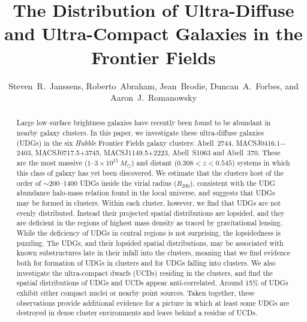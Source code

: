 \documentclass[iop,tighten,twocolumn,apj,floatfix]{emulateapj}
\begin{document}
\title{The Distribution of Ultra-Diffuse and Ultra-Compact Galaxies in the Frontier Fields}

\author{Steven~R.~Janssens, Roberto~Abraham,
Jean~Brodie, Duncan~A.~Forbes, and
Aaron~J.~Romanowsky}




\begin{abstract}
Large low surface brightness galaxies have recently been found to be abundant
in nearby galaxy clusters. In this paper, we investigate these
ultra-diffuse galaxies (UDGs) in the six \textit{Hubble} Frontier Fields
galaxy clusters: Abell~2744, MACSJ0416.1$-$2403,
MACSJ0717.5$+$3745, MACSJ1149.5$+$2223, Abell~S1063 and Abell~370.  These
are the most massive ($1$--$3 \times 10^{15}~M_\odot$) and distant ($0.308
< z < 0.545$) systems in which this class of galaxy has yet been
discovered. We estimate that the clusters host of the order of ${\sim}$200--1400 UDGs
inside the virial radius ($R_{200}$), consistent with the UDG abundance
halo-mass relation found in the local universe, and suggests that UDGs may
be formed in clusters. Within each cluster, however, we find that UDGs are
not evenly distributed. Instead their projected spatial distributions are
lopsided, and they are deficient in the regions of highest mass density as
traced by gravitational lensing. While the deficiency of UDGs in central
regions is not surprising, the lopsidedness is puzzling. The UDGs, and their
lopsided spatial distributions, may be
associated with known substructures late in their infall into the
clusters, meaning that we find evidence both for formation of UDGs in clusters
and for UDGs falling into clusters. We also investigate the ultra-compact
dwarfs (UCDs) residing in the clusters, and find the spatial distributions
of UDGs and UCDs appear anti-correlated. Around 15\% of UDGs exhibit
either compact nuclei or nearby point sources. Taken together, these
observations provide additional evidence for a picture in which at least some
UDGs are destroyed in dense cluster environments and leave behind a
residue of UCDs.
\end{abstract}
\end{document}
